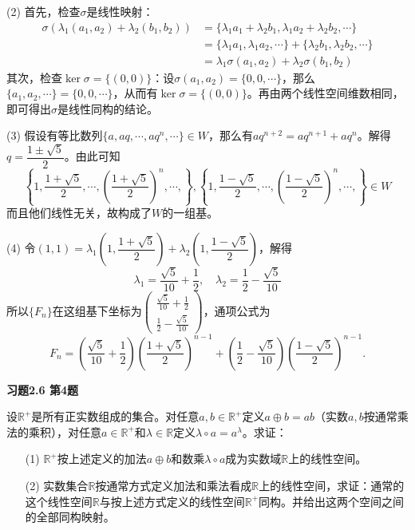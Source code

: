 (2) 首先，检查$\sigma$是线性映射：
\begin{align*}
\sigma(\lambda_1(a_1,a_2)+\lambda_2(b_1,b_2)) & = \{\lambda_1a_1+\lambda_2b_1, \lambda_1a_2+\lambda_2b_2,\cdots\} \\
& = \{\lambda_1a_1, \lambda_1a_2,\cdots\} + \{\lambda_2b_1, \lambda_2b_2,\cdots\} \\
& = \lambda_1\sigma(a_1,a_2) + \lambda_2\sigma(b_1,b_2)
\end{align*}
其次，检查$\ker\sigma = \{(0,0)\}$：设$\sigma(a_1,a_2) = \{0,0,\cdots\}$，那么$\{a_1,a_2,\cdots\} = \{0,0,\cdots\}$，从而有$\ker\sigma = \{(0,0)\}$。再由两个线性空间维数相同，即可得出$\sigma$是线性同构的结论。

(3) 假设有等比数列$\{a,aq,\cdots,aq^n,\cdots\}\in W$，那么有$aq^{n+2} = aq^{n+1} + aq^{n}$。解得$q = \dfrac{1\pm\sqrt{5}}{2}$。由此可知
$$\left\{1, \dfrac{1+\sqrt{5}}{2}, \cdots, \left(\dfrac{1+\sqrt{5}}{2}\right)^n, \cdots, \right\}, \left\{1, \dfrac{1-\sqrt{5}}{2}, \cdots, \left(\dfrac{1-\sqrt{5}}{2}\right)^n, \cdots, \right\} \in W$$
而且他们线性无关，故构成了$W$的一组基。

(4) 令$(1,1) = \lambda_1 \left(1, \dfrac{1+\sqrt{5}}{2}\right) + \lambda_2 \left(1, \dfrac{1-\sqrt{5}}{2}\right)$，解得
$$\lambda_1 = \frac{\sqrt{5}}{10} + \frac{1}{2}, \quad \lambda_2 = \frac{1}{2} - \frac{\sqrt{5}}{10}$$
所以$\{F_n\}$在这组基下坐标为$\begin{pmatrix}\frac{\sqrt{5}}{10} + \frac{1}{2}\\\frac{1}{2} - \frac{\sqrt{5}}{10}\end{pmatrix}$，通项公式为
$$F_n = \left( \frac{\sqrt{5}}{10} + \frac{1}{2} \right) \left( \dfrac{1+\sqrt{5}}{2} \right)^{n-1} + \left( \frac{1}{2} - \frac{\sqrt{5}}{10} \right) \left( \dfrac{1-\sqrt{5}}{2} \right)^{n-1}.$$

\newpageorvspace

{\bf 习题2.6 第4题}

设$\mathbb{R}^+$是所有正实数组成的集合。对任意$a,b\in\mathbb{R}^+$定义$a\oplus b = ab$（实数$a,b$按通常乘法的乘积），对任意$a\in\mathbb{R}^+$和$\lambda\in\mathbb{R}$定义$\lambda\circ a = a^{\lambda}$。求证：
\begin{itemize}
\item[(1)] $\mathbb{R}^+$按上述定义的加法$a\oplus b$和数乘$\lambda\circ a$成为实数域$\mathbb{R}$上的线性空间。
\item[(2)] 实数集合$\mathbb{R}$按通常方式定义加法和乘法看成$\mathbb{R}$上的线性空间，求证：通常的这个线性空间$\mathbb{R}$与按上述方式定义的线性空间$\mathbb{R}^+$同构。并给出这两个空间之间的全部同构映射。
\end{itemize}

